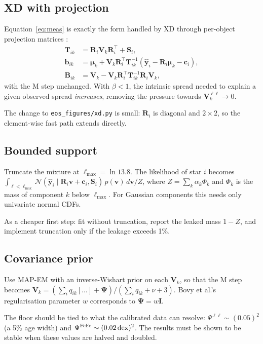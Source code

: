 \documentclass[11pt,a4paper]{article}
\newcommand{\N}{\ensuremath{\mathcal{N}}}
\begin{document}
\subsection{XD with projection}
Equation~\eqref{eq:meas} is exactly the form handled by XD through per-object projection matrices \citep[][their Sec.~2]{Bovy2011}:
\begin{align}
  \mathbf T_{ik}&=\mathbf R_i\mathbf V_k\mathbf R_i^{\top}+\mathbf S_i,\\
  \bm b_{ik}&=\bm\mu_k+\mathbf V_k\mathbf R_i^{\top}\mathbf T_{ik}^{-1}\left(\hat{\bm y}_i-\mathbf R_i\bm\mu_k-\bm c_i\right),\\
  \mathbf B_{ik}&=\mathbf V_k-\mathbf V_k\mathbf R_i^{\top}\mathbf T_{ik}^{-1}\mathbf R_i\mathbf V_k,
\end{align}
with the M step unchanged. With $\beta<1$, the intrinsic spread needed to explain a given observed spread \emph{increases}, removing the pressure towards $\mathbf V_k^{\ell\ell}\to0$.

The change to \texttt{eos\_figures/xd.py} is small: $\mathbf R_i$ is diagonal and $2\times2$, so the element-wise fast path extends directly.

\subsection{Bounded support}
Truncate the mixture at $\ell_{\max}=\ln13.8$. The likelihood of star $i$ becomes $\int_{\ell<\ell_{\max}}\N(\hat{\bm y}_i\mid\mathbf R_i\bm v+\bm c_i,\mathbf S_i)\,p(\bm v)\,d\bm v/Z$, where $Z=\sum_k\alpha_k\Phi_k$ and $\Phi_k$ is the mass of component $k$ below $\ell_{\max}$. For Gaussian components this needs only univariate normal CDFs.

As a cheaper first step: fit without truncation, report the leaked mass $1-Z$, and implement truncation only if the leakage exceeds 1\%.

\subsection{Covariance prior}
Use MAP-EM with an inverse-Wishart prior on each $\mathbf V_k$, so that the M step becomes $\mathbf V_k=(\sum_i q_{ik}[\ldots]+\bm\Psi)/(\sum_i q_{ik}+\nu+3)$. Bovy et al.'s regularisation parameter $w$ corresponds to $\bm\Psi=w\mathbf I$.

The floor should be tied to what the calibrated data can resolve: $\Psi^{\ell\ell}\sim(0.05)^2$ (a 5\% age width) and $\Psi^{\rm FeFe}\sim(0.02\,{\rm dex})^2$. The results must be shown to be stable when these values are halved and doubled.
\end{document}
